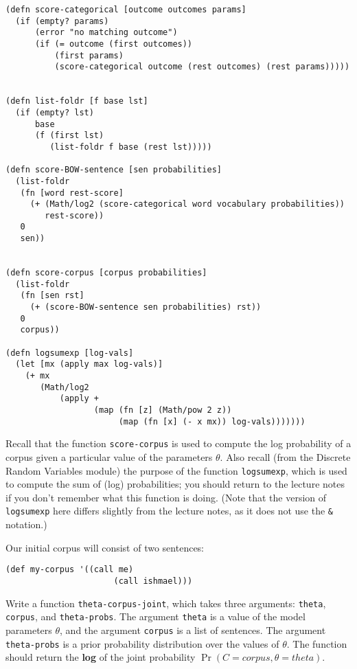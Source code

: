 \documentclass[10pt]{article}
\begin{document}
\begin{lstlisting}
(defn score-categorical [outcome outcomes params]
  (if (empty? params)
      (error "no matching outcome")
      (if (= outcome (first outcomes))
          (first params)
          (score-categorical outcome (rest outcomes) (rest params)))))


(defn list-foldr [f base lst]
  (if (empty? lst)
      base
      (f (first lst)
         (list-foldr f base (rest lst)))))

(defn score-BOW-sentence [sen probabilities]
  (list-foldr 
   (fn [word rest-score] 
     (+ (Math/log2 (score-categorical word vocabulary probabilities))
        rest-score))
   0
   sen))


(defn score-corpus [corpus probabilities]
  (list-foldr
   (fn [sen rst]
     (+ (score-BOW-sentence sen probabilities) rst))
   0
   corpus))

(defn logsumexp [log-vals]
  (let [mx (apply max log-vals)]
    (+ mx
       (Math/log2
           (apply +
                  (map (fn [z] (Math/pow 2 z))
                       (map (fn [x] (- x mx)) log-vals)))))))
\end{lstlisting}

Recall that the function \texttt{score-corpus} is used to compute the
log probability of a corpus given a particular value of the parameters
$\theta$. Also recall (from the Discrete Random Variables module) the
purpose of the function \texttt{logsumexp}, which is used to compute
the sum of (log) probabilities; you should return to the lecture notes
if you don't remember what this function is doing. (Note that the
version of \texttt{logsumexp} here differs slightly from the lecture
notes, as it does not use the \texttt{\&} notation.)

Our initial corpus will consist of two sentences:

\begin{lstlisting}
(def my-corpus '((call me)
                      (call ishmael)))
\end{lstlisting}

Write a function \texttt{theta-corpus-joint}, which takes three
arguments: \texttt{theta}, \texttt{corpus}, and
\texttt{theta-probs}. The argument \texttt{theta} is a value of the
model parameters $\theta$, and the argument \texttt{corpus} is a list
of sentences. The argument \texttt{theta-probs} is a prior probability
distribution over the values of $\theta$. The function should return
the \textbf{log} of the joint probability
$\Pr(C=corpus,\theta=theta)$.
\end{document}
